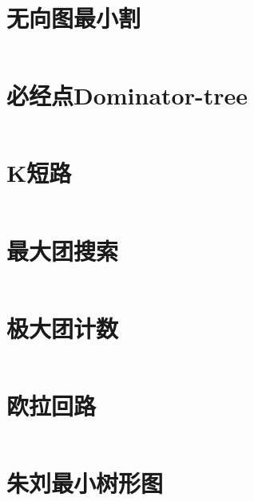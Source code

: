\section{无向图最小割}
\inputminted{cpp}{\source/graph-theory/StoerWagner_O(V^3).cpp}
\section{必经点Dominator-tree}
\inputminted{cpp}{\source/graph-theory/dominator.cpp}
\section{K短路}
\inputminted{cpp}{\source/graph-theory/Kth-minimum-path.cpp}
\section{最大团搜索}
\inputminted{cpp}{\source/graph-theory/MaximumClique.cpp}
\section{极大团计数}
\inputminted{cpp}{\source/graph-theory/极大团计数.cpp}
\section{欧拉回路}
\inputminted{cpp}{\source/graph-theory/euler-tour.cpp}
\section{朱刘最小树形图}
\inputminted{cpp}{\source/graph-theory/minimum_arborescence.cpp}
